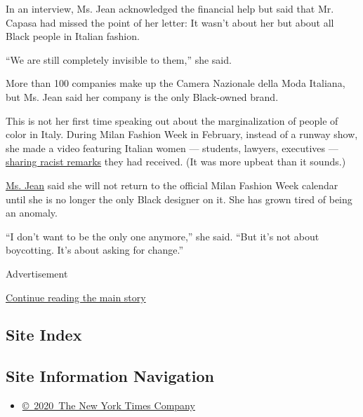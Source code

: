 In an interview, Ms. Jean acknowledged the financial help but said that
Mr. Capasa had missed the point of her letter: It wasn't about her but
about all Black people in Italian fashion.

``We are still completely invisible to them,'' she said.

More than 100 companies make up the Camera Nazionale della Moda
Italiana, but Ms. Jean said her company is the only Black-owned brand.

This is not her first time speaking out about the marginalization of
people of color in Italy. During Milan Fashion Week in February, instead
of a runway show, she made a video featuring Italian women --- students,
lawyers, executives ---
\href{https://www.youtube.com/watch?v=ykhRrN0r5NI}{sharing racist
remarks} they had received. (It was more upbeat than it sounds.)

\href{https://www.nytimes3xbfgragh.onion/2013/09/24/fashion/Giorgio-Armani-Gives-Young-Designer-a-Hand.html?searchResultPosition=20}{Ms.
Jean} said she will not return to the official Milan Fashion Week
calendar until she is no longer the only Black designer on it. She has
grown tired of being an anomaly.

``I don't want to be the only one anymore,'' she said. ``But it's not
about boycotting. It's about asking for change.''

Advertisement

\protect\hyperlink{after-bottom}{Continue reading the main story}

\hypertarget{site-index}{%
\subsection{Site Index}\label{site-index}}

\hypertarget{site-information-navigation}{%
\subsection{Site Information
Navigation}\label{site-information-navigation}}

\begin{itemize}
\tightlist
\item
  \href{https://help.nytimes3xbfgragh.onion/hc/en-us/articles/115014792127-Copyright-notice}{©~2020~The
  New York Times Company}
\end{itemize}

